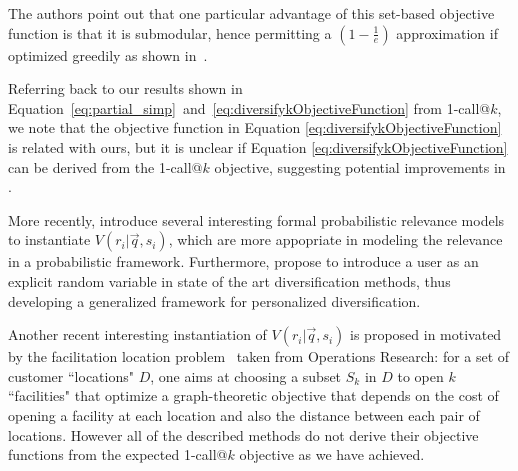 The authors point out that one particular advantage of this set-based objective 
function is that it is submodular, hence permitting a $\left( 1 - \frac{1}{e} \right)$
approximation if optimized greedily as shown in~\cite{Nemhauser:MathProg1978}.

Referring back to our results shown in Equation~\ref{eq:partial_simp}~and~\eqref{eq:diversifykObjectiveFunction} from 1-call@$k$, we note that the objective function in Equation \eqref{eq:diversifykObjectiveFunction} is related with ours, but it is unclear if Equation \eqref{eq:diversifykObjectiveFunction} can be derived from the 1-call@$k$ objective, suggesting potential improvements in \cite{agrawal09diversifying}. 

More recently, \cite{Vargas:SIGIR2012} introduce several interesting formal probabilistic
relevance models to instantiate $V(r_i| \vec{q}, s_i)$, which are more
appopriate in modeling the relevance in a probabilistic
framework. Furthermore, \cite{Vallet:SIGIR2012} propose to introduce a
user as an explicit random variable in state of the art
diversification methods, thus developing a generalized framework for
personalized diversification.

Another recent interesting instantiation of $V(r_i|\vec{q},s_i)$ is proposed
in \cite{Zuccon:ECIR2012} motivated by the facilitation location
problem~\cite{Gonzalez:Handbook2007} taken from Operations Research:
for a set of customer ``locations" $D$, one aims at choosing a subset
$S_k$ in $D$ to open $k$ ``facilities" that optimize a graph-theoretic
objective that depends on the cost of opening a facility at each
location and also the distance between each pair of locations. However
all of the described methods do not derive their objective
functions from the expected 1-call@$k$ objective as we have achieved.

